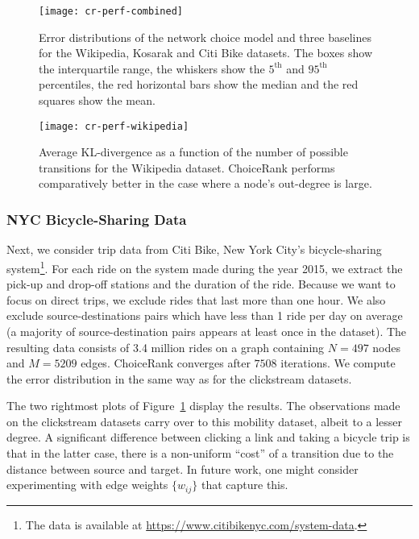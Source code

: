 \begin{figure}
  \centering
  \texttt{[image: cr-perf-combined]}
  \caption{
Error distributions of the network choice model and three baselines for the Wikipedia, Kosarak and Citi Bike datasets.
The boxes show the interquartile range, the whiskers show the $5^{\text{th}}$ and $95^{\text{th}}$ percentiles, the red horizontal bars show the median and the red squares show the mean.
}
  \label{cr:fig:perf-combined}
\end{figure}

\begin{figure}
  \centering
  \texttt{[image: cr-perf-wikipedia]}
  \caption{
Average KL-divergence as a function of the number of possible transitions for the Wikipedia dataset.
ChoiceRank performs comparatively better in the case where a node's out-degree is large.
}
  \label{cr:fig:perf-wikipedia}
\end{figure}


\subsubsection{NYC Bicycle-Sharing Data}

Next, we consider trip data from Citi Bike, New York City's bicycle-sharing system\footnote{The data is available at \url{https://www.citibikenyc.com/system-data}.}.
For each ride on the system made during the year 2015, we extract the pick-up and drop-off stations and the duration of the ride.
Because we want to focus on direct trips, we exclude rides that last more than one hour.
We also exclude source-destinations pairs which have less than 1 ride per day on average (a majority of source-destination pairs appears at least once in the dataset).
The resulting data consists of \num{3.4} million rides on a graph containing $N = \num{497}$ nodes and $M = \num{5209}$ edges.
ChoiceRank converges after $\num{7508}$ iterations.
We compute the error distribution in the same way as for the clickstream datasets.

The two rightmost plots of Figure~\ref{cr:fig:perf-combined} display the results.
The observations made on the clickstream datasets carry over to this mobility dataset, albeit to a lesser degree.
A significant difference between clicking a link and taking a bicycle trip is that in the latter case, there is a non-uniform ``cost'' of a transition due to the distance between source and target.
In future work, one might consider experimenting with edge weights $\{ w_{ij} \}$ that capture this.


